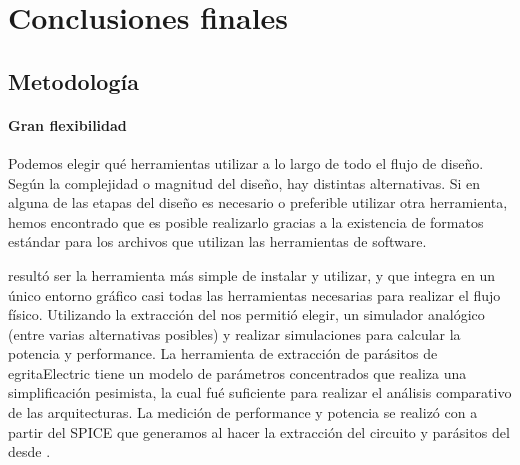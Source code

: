 	\chapter{Conclusiones finales}

  
\section{Metodología}
\subsubsection{Gran flexibilidad} Podemos elegir qué herramientas utilizar a lo largo de todo el flujo de diseño. Según la complejidad o magnitud del diseño, hay distintas alternativas. Si en alguna de las etapas del diseño es necesario o preferible utilizar otra herramienta, hemos encontrado que es posible realizarlo gracias a la existencia de formatos estándar para los archivos que utilizan las herramientas de software.


 resultó ser la herramienta más simple de instalar y utilizar, y que integra en un único entorno gráfico casi todas las herramientas necesarias para realizar el flujo físico. Utilizando la extracción del  nos permitió elegir, un simulador analógico (entre varias alternativas posibles) y realizar simulaciones para calcular la potencia y performance. La herramienta de extracción de parásitos de 
egrita{Electric} tiene un modelo de parámetros concentrados que realiza una simplificación pesimista, la cual fué suficiente para realizar el análisis comparativo de las arquitecturas. La medición de performance y potencia se realizó con  a partir del  SPICE que generamos al hacer la extracción del circuito y parásitos del \layout desde .

